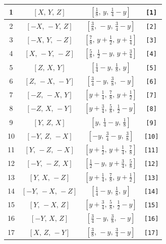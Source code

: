 \documentclass[fleqn,8pt]{jsarticle}
\begin{document}
\begin{longtable}{cccc}
1 & $\left[ X,\, Y,\, Z \right]$ & $\left[ \frac{1}{8},\, y,\, \frac{1}{4} - y \right]$ & {\tt [1]} \\ \hline
2 & $\left[ - X,\, - Y,\, Z \right]$ & $\left[ \frac{3}{8},\, - y,\, \frac{3}{4} - y \right]$ & {\tt [2]} \\ \hline
3 & $\left[ - X,\, Y,\, - Z \right]$ & $\left[ \frac{7}{8},\, y + \frac{1}{2},\, y + \frac{1}{4} \right]$ & {\tt [3]} \\ \hline
4 & $\left[ X,\, - Y,\, - Z \right]$ & $\left[ \frac{5}{8},\, \frac{1}{2} - y,\, y + \frac{3}{4} \right]$ & {\tt [4]} \\ \hline
5 & $\left[ Z,\, X,\, Y \right]$ & $\left[ \frac{1}{4} - y,\, \frac{1}{8},\, y \right]$ & {\tt [5]} \\ \hline
6 & $\left[ Z,\, - X,\, - Y \right]$ & $\left[ \frac{3}{4} - y,\, \frac{3}{8},\, - y \right]$ & {\tt [6]} \\ \hline
7 & $\left[ - Z,\, - X,\, Y \right]$ & $\left[ y + \frac{1}{4},\, \frac{7}{8},\, y + \frac{1}{2} \right]$ & {\tt [7]} \\ \hline
8 & $\left[ - Z,\, X,\, - Y \right]$ & $\left[ y + \frac{3}{4},\, \frac{5}{8},\, \frac{1}{2} - y \right]$ & {\tt [8]} \\ \hline
9 & $\left[ Y,\, Z,\, X \right]$ & $\left[ y,\, \frac{1}{4} - y,\, \frac{1}{8} \right]$ & {\tt [9]} \\ \hline
10 & $\left[ - Y,\, Z,\, - X \right]$ & $\left[ - y,\, \frac{3}{4} - y,\, \frac{3}{8} \right]$ & {\tt [10]} \\ \hline
11 & $\left[ Y,\, - Z,\, - X \right]$ & $\left[ y + \frac{1}{2},\, y + \frac{1}{4},\, \frac{7}{8} \right]$ & {\tt [11]} \\ \hline
12 & $\left[ - Y,\, - Z,\, X \right]$ & $\left[ \frac{1}{2} - y,\, y + \frac{3}{4},\, \frac{5}{8} \right]$ & {\tt [12]} \\ \hline
13 & $\left[ Y,\, X,\, - Z \right]$ & $\left[ y + \frac{1}{4},\, \frac{7}{8},\, y + \frac{1}{2} \right]$ & {\tt [13]} \\ \hline
14 & $\left[ - Y,\, - X,\, - Z \right]$ & $\left[ \frac{1}{4} - y,\, \frac{1}{8},\, y \right]$ & {\tt [14]} \\ \hline
15 & $\left[ Y,\, - X,\, Z \right]$ & $\left[ y + \frac{3}{4},\, \frac{5}{8},\, \frac{1}{2} - y \right]$ & {\tt [15]} \\ \hline
16 & $\left[ - Y,\, X,\, Z \right]$ & $\left[ \frac{3}{4} - y,\, \frac{3}{8},\, - y \right]$ & {\tt [16]} \\ \hline
17 & $\left[ X,\, Z,\, - Y \right]$ & $\left[ \frac{3}{8},\, - y,\, \frac{3}{4} - y \right]$ & {\tt [17]} \\ \hline

\end{longtable}
\end{document}
